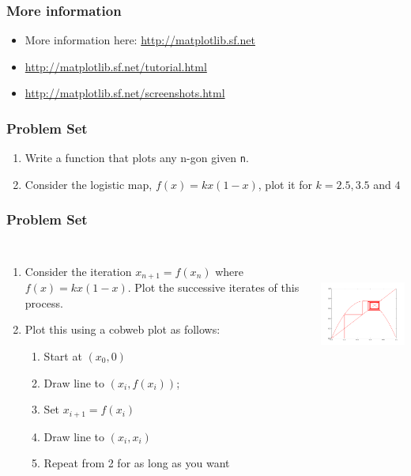 \documentclass[14pt,compress]{beamer}
\newcounter{time}
\newcommand{\inctime}[1]{\addtocounter{time}{#1}{\tiny \thetime\ m}}
\newcommand{\typ}[1]{\texttt{#1}}
\begin{document}
\begin{frame}
  \frametitle{More information}
  \begin{itemize}
  \item More information here: \url{http://matplotlib.sf.net}
  \item \url{http://matplotlib.sf.net/tutorial.html}
  \item \url{http://matplotlib.sf.net/screenshots.html}
  \end{itemize}
\end{frame}

\begin{frame}
  \frametitle{Problem Set}
  \begin{enumerate}
      \item Write a function that plots any n-gon given \typ{n}.
      \item Consider the logistic map, $f(x) = kx(1-x)$, plot it for
          $k=2.5, 3.5$ and $4$
\end{enumerate}
\end{frame}

\begin{frame}[fragile] 
\frametitle{Problem Set}
  \begin{columns}
    \small{
    \begin{enumerate}
      \item Consider the iteration $x_{n+1} = f(x_n)$ where $f(x) =
          kx(1-x)$.  Plot the successive iterates of this process.
      \item Plot this using a cobweb plot as follows:
          \begin{enumerate}
              \item Start at $(x_0, 0)$
              \item Draw line to $(x_i, f(x_i))$; 
              \item Set $x_{i+1} = f(x_i)$
              \item Draw line to $(x_i, x_i)$
              \item Repeat from 2 for as long as you want 
          \end{enumerate}
    \end{enumerate}}
    \hspace*{-0.5in}
  \includegraphics[height=1.6in, interpolate=true]{data/cobweb}  
\end{columns}
\inctime{20}
\end{frame}
\end{document}
